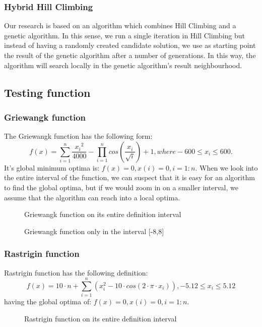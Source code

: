 \documentclass{article}
\begin{document}
\subsubsection{Hybrid Hill Climbing}
Our research is based on an algorithm which combines Hill Climbing and a genetic algorithm. In this sense, we run a single iteration in Hill Climbing but instead of having a randomly created candidate solution, we use as starting point the result of the genetic algorithm after a number of generations. In this way, the algorithm will search locally in the genetic algorithm's result neighbourhood.
\subsection{Testing function}
\subsubsection{Griewangk function}
The Griewangk function has the following form:
$$f(x) = \sum_{i = 1}^n \frac{{x_i}^2}{4000} - \prod_{i = 1}^n cos\left(\frac{x_i}{\sqrt{i}}\right) + 1, where -600 \leq x_i \leq 600.$$
It's global minimum optima is: $f(x) = 0, x(i) = 0, i = 1:n$. When we look into the entire interval of the function, we can suspect that it is easy for an algorithm to find the global optima, but if we would zoom in on a smaller interval, we assume that the algorithm can reach into a local optima.
\begin{figure}[h!]
  \centering
  
  \caption{Griewangk function on its entire definition interval}
\end{figure}
\begin{figure}[h!]
  \centering
  
  \caption{Griewangk function only in the interval [-8,8]}
\end{figure}
\subsubsection{Rastrigin function}
Rastrigin function has the following definition:
$$f(x) = 10 \cdot n + \sum_{i=1}^n\left(x_i^2 - 10\cdot cos(2 \cdot \pi \cdot x_i)\right), -5.12 \leq x_i \leq 5.12$$
having the global optima of: $f(x) = 0, x(i) = 0, i = 1:n$. 
\begin{figure}[h!]
  \centering
  
  \caption{Rastrigin function on its entire definition interval}
\end{figure}
\end{document}
